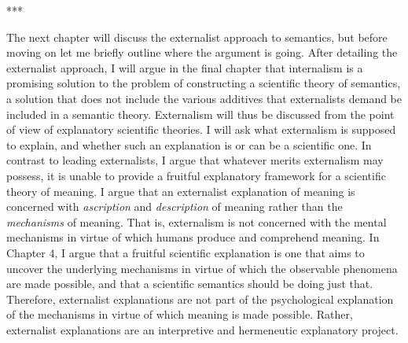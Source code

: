 \begin{center}
***
\end{center}

The next chapter will discuss the externalist approach to semantics, but before moving on let me briefly outline where the argument is going. After detailing the externalist approach, I will argue in the final chapter that internalism is a promising solution to the problem of constructing a scientific theory of semantics, a solution that does not include the various additives that externalists demand be included in a semantic theory. Externalism will thus be discussed from the point of view of explanatory scientific theories. I will ask what externalism is supposed to explain, and whether such an explanation is or can be a scientific one. In contrast to leading externalists, I argue that whatever merits externalism may possess, it is unable to provide a fruitful explanatory framework for a scientific theory of meaning. I argue that an externalist explanation of meaning is concerned with \textit{ascription }and \textit{description }of meaning rather than the \textit{mechanisms} of meaning. That is, externalism is not concerned with the mental mechanisms in virtue of which humans produce and comprehend meaning. In Chapter 4, I argue that a fruitful scientific explanation is one that aims to uncover the underlying mechanisms in virtue of which the observable phenomena are made possible, and that a scientific semantics should be doing just that. Therefore, externalist explanations are not part of the psychological explanation of the mechanisms in virtue of which meaning is made possible. Rather, externalist explanations are an interpretive and hermeneutic explanatory project.

